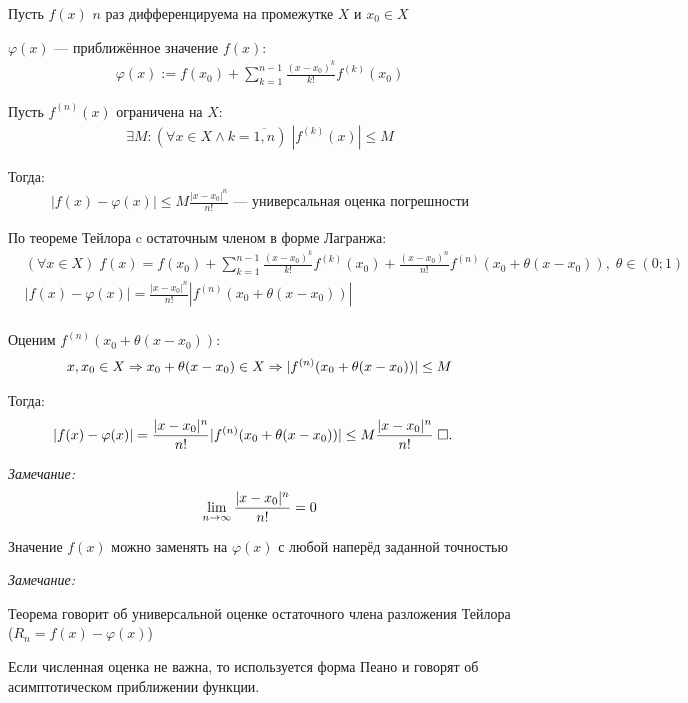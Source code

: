 \documentclass{article}
\begin{document}

\theorem

Пусть $f(x)$ $n$ раз дифференцируема на промежутке $X$ и $x_0\in X$

$\varphi(x)$ --- приближённое значение $f(x)$:
\begin{align*}
	\varphi(x):=f(x_0)+\sum_{k=1}^{n-1}\frac{(x-x_0)^{k}}{k!}f^{(k)}(x_0)
\end{align*}

Пусть $f^{(n)}(x)$ ограничена на $X$:
\begin{align*}
	\exists M:(\forall x\in X \land k = \overline{1,n} )\;|f^{(k)}(x)|\leq M
\end{align*}

Тогда:
\begin{align*}
	|f(x)-\varphi(x)|\leq M\frac{|x-x_0|^{n}}{n!}\text{ --- универсальная оценка погрешности}
\end{align*}

\proof

По теореме Тейлора c остаточным членом в форме Лагранжа:
\begin{align*}
	 & (\forall x\in X)\;f(x)=f(x_0)+\sum_{k=1}^{n-1}\frac{(x-x_0)^{k}}{k!}f^{(k)}(x_0)+\frac{(x-x_0)^{n}}{n!}f^{(n)}(x_0+\theta(x-x_0)),\;\theta\in(0;1) \\
	 & |f(x)-\varphi(x)|=\frac{|x-x_0|^{n}}{n!}|f^{(n)}(x_0+\theta(x-x_0))|                                                                               \\
\end{align*}

Оценим $f^{(n)}(x_0+\theta(x-x_0))$:
\begin{align*}
	x, x_0 \in X\Rarr x_0+\theta(x-x_0)\in X \Rarr |f^{(n)}(x_0+\theta(x-x_0))|\leq M
\end{align*}

Тогда:
\begin{align*}
	 & |f(x)-\varphi(x)|=\frac{|x-x_0|^{n}}{n!}|f^{(n)}(x_0+\theta(x-x_0))|\leq M\frac{|x-x_0|^{n}}{n!}\qed
\end{align*}

{\it Замечание:}
\begin{align*}
	\slimty\frac{|x-x_0|^{n}}{n!}=0
\end{align*}

\result

Значение $f(x)$ можно заменять на $\varphi(x)$ с любой наперёд заданной точностью

{\it Замечание:}

Теорема говорит об универсальной оценке остаточного члена разложения Тейлора ($R_n = f(x)-\varphi(x)$)

Если численная оценка не важна, то используется форма Пеано и говорят об асимптотическом приближении функции.
\end{document}
